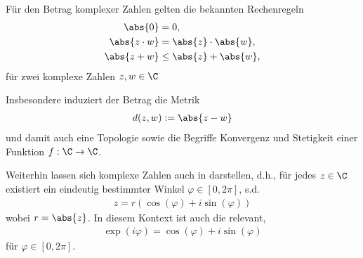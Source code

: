 \documentclass[letterpaper,10pt,german]{jupyterBook}
\begin{document}
\sphinxAtStartPar
Für den Betrag komplexer Zahlen gelten die bekannten Rechenregeln
\begin{equation*}
\begin{split}\abs{0}&=0,\\
\abs{z\cdot w} &= \abs{z}\cdot \abs{w},\\
\abs{z+w}&\leq\abs{z}+\abs{w},\end{split}
\end{equation*}
\sphinxAtStartPar
für zwei komplexe Zahlen \(z,w\in\C\)

\sphinxAtStartPar
Insbesondere induziert der Betrag die Metrik
\begin{equation*}
\begin{split}d(z,w):= \abs{z-w}\end{split}
\end{equation*}
\sphinxAtStartPar
und damit auch eine Topologie sowie die Begriffe Konvergenz und Stetigkeit einer Funktion \(f:\C\to\C\).

\sphinxAtStartPar
Weiterhin lassen sich komplexe Zahlen auch in  darstellen, d.h., für jedes \(z\in\C\) existiert ein eindeutig bestimmter Winkel \(\varphi\in [0,2\pi]\), s.d.
\begin{equation*}
\begin{split}z = r(\cos(\varphi) + i\sin(\varphi))\end{split}
\end{equation*}
\sphinxAtStartPar
wobei \(r=\abs{z}\). In diesem Kontext ist auch die  relevant,
\begin{equation}\label{equation:complexanalysis/complexnumbers:eq:euler}
\begin{split}\exp(i\varphi) = \cos(\varphi) + i\sin(\varphi)\end{split}
\end{equation}
\sphinxAtStartPar
für \(\varphi\in [0,2\pi]\).
\end{document}
